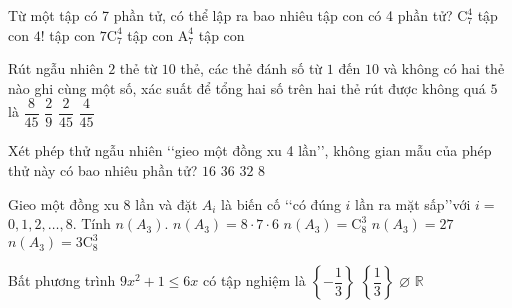 \begin{ex}%
	Từ một tập có 7 phần tử, có thể lập ra bao nhiêu tập con có 4 phần tử?
	\choice
	{\True $\mathrm C_7^4$ tập con}
	{$4!$ tập con}
	{$7 \mathrm C_7^4$ tập con}
	{$\mathrm A_7^4$ tập con}
\end{ex}
\begin{ex}%
	Rút ngẫu nhiên $2$ thẻ từ $10$ thẻ, các thẻ đánh số từ $1$ đến $10$ và không có hai thẻ nào ghi cùng một số, xác suất để tổng hai số trên hai thẻ rút được không quá $5$ là
	\choice
	{\True $\dfrac{8}{45}$}
	{$\dfrac{2}{9}$}
	{$\dfrac{2}{45}$}
	{$\dfrac{4}{45}$}
\end{ex}
\begin{ex}%
	Xét phép thử ngẫu nhiên \lq\lq gieo một đồng xu 4 lần\rq\rq, không gian mẫu của phép thử này có bao nhiêu phần tử?
	\choice
	{\True $16$}
	{$36$}
	{$32$}
	{$8$}
\end{ex}
\begin{ex}%
	Gieo một đồng xu $8$ lần và đặt $A_i$ là biến cố \lq\lq có đúng $i$ lần ra mặt sấp\rq\rq  với $i=$ $0,1,2, \ldots, 8$. Tính $n\left(A_3\right)$.
	\choice
	{$n\left(A_3\right)=8 \cdot 7 \cdot 6$}
	{\True $n\left(A_3\right)=\mathrm C_8^3$}
	{$n\left(A_3\right)=27$}
	{$n\left(A_3\right)=3 \mathrm C_8^3$}
\end{ex}
\begin{ex}%
	Bất phương trình $9 x^2+1 \leqslant 6 x$ có tập nghiệm là
	\choice
	{$\left\{-\dfrac{1}{3}\right\}$}
	{\True $\left\{\dfrac{1}{3}\right\}$}
	{$\varnothing$}
	{$\mathbb{R}$}
\end{ex}

